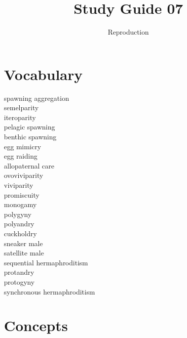\documentclass[nofonts, letterpaper]{tufte-handout}
\title{Study Guide 07}
\author{Reproduction}
\date{} %
\begin{document}
\maketitle	%


\section{Vocabulary} 
\vspace{-1\baselineskip}
\begin{multicols}{2}
spawning aggregation \\
semelparity \\
iteroparity \\
pelagic spawning \\
benthic spawning \\
egg mimicry \\
egg raiding \\
allopaternal care \\
ovoviviparity \\
viviparity \\
promiscuity \\
monogamy \\
polygyny \\
polyandry \\
cuckholdry \\
sneaker male \\
satellite male \\
sequential hermaphroditism \\
protandry \\
protogyny \\
synchronous hermaphroditism 
\end{multicols}

\section{Concepts}
\end{document}
